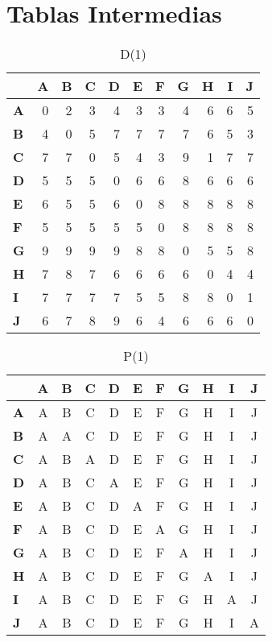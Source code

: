 \documentclass{article}
\begin{document}
\section*{Tablas Intermedias}
\begin{table}[H]\centering
\caption{D(1)}
\begin{tabular}{l r r r r r r r r r r}
\toprule
 & \textbf{A} & \textbf{B} & \textbf{C} & \textbf{D} & \textbf{E} & \textbf{F} & \textbf{G} & \textbf{H} & \textbf{I} & \textbf{J}\\\midrule
\textbf{A} & 0 & 2 & 3 & 4 & 3 & 3 & 4 & 6 & 6 & 5 \\
\textbf{B} & 4 & 0 & 5 & 7 & \cellcolor{yellow!30}7 & \cellcolor{yellow!30}7 & 7 & 6 & 5 & 3 \\
\textbf{C} & 7 & 7 & 0 & 5 & 4 & 3 & 9 & 1 & 7 & 7 \\
\textbf{D} & 5 & 5 & 5 & 0 & 6 & 6 & 8 & 6 & 6 & 6 \\
\textbf{E} & 6 & 5 & 5 & 6 & 0 & 8 & 8 & 8 & 8 & 8 \\
\textbf{F} & 5 & 5 & 5 & 5 & 5 & 0 & 8 & 8 & 8 & 8 \\
\textbf{G} & 9 & 9 & 9 & 9 & 8 & 8 & 0 & 5 & 5 & 8 \\
\textbf{H} & 7 & 8 & 7 & 6 & 6 & 6 & 6 & 0 & 4 & 4 \\
\textbf{I} & 7 & 7 & 7 & 7 & 5 & 5 & 8 & 8 & 0 & 1 \\
\textbf{J} & 6 & 7 & 8 & 9 & 6 & 4 & 6 & 6 & 6 & 0 \\
\bottomrule
\end{tabular}
\end{table}

\begin{table}[H]\centering
\caption{P(1)}
\begin{tabular}{l c c c c c c c c c c}
\toprule
 & \textbf{A} & \textbf{B} & \textbf{C} & \textbf{D} & \textbf{E} & \textbf{F} & \textbf{G} & \textbf{H} & \textbf{I} & \textbf{J}\\\midrule
\textbf{A} & \cellcolor{yellow!30}A & B & C & D & E & F & G & H & I & J \\
\textbf{B} & A & \cellcolor{yellow!30}A & C & D & E & F & G & H & I & J \\
\textbf{C} & A & B & \cellcolor{yellow!30}A & D & E & F & G & H & I & J \\
\textbf{D} & A & B & C & \cellcolor{yellow!30}A & E & F & G & H & I & J \\
\textbf{E} & A & B & C & D & \cellcolor{yellow!30}A & F & G & H & I & J \\
\textbf{F} & A & B & C & D & E & \cellcolor{yellow!30}A & G & H & I & J \\
\textbf{G} & A & B & C & D & E & F & \cellcolor{yellow!30}A & H & I & J \\
\textbf{H} & A & B & C & D & E & F & G & \cellcolor{yellow!30}A & I & J \\
\textbf{I} & A & B & C & D & E & F & G & H & \cellcolor{yellow!30}A & J \\
\textbf{J} & A & B & C & D & E & F & G & H & I & \cellcolor{yellow!30}A \\
\bottomrule
\end{tabular}
\end{table}
\end{document}
